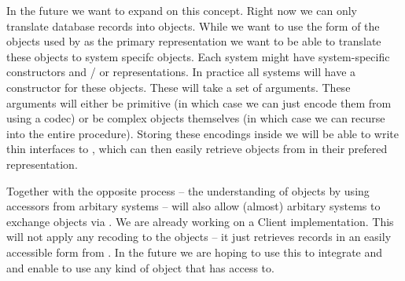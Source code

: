 \documentclass{deliverablereport}
\begin{document}
In the future we want to expand on this concept. Right now we can only translate database records into \MMT objects. While we want to use the form of the objects used by \MMT as the primary representation we want to be able to translate these objects to system specifc objects. Each system might have system-specific constructors and / or representations. In practice all systems will have a constructor for these objects. These will take a set of arguments. These arguments will either be primitive (in which case we can just encode them from \MMT using a codec) or be complex objects themselves (in which case we can recurse into the entire procedure). Storing these encodings inside \MMT we will be able to write thin interfaces to \MMT, which can then easily retrieve objects from \MMT in their prefered representation.

Together with the opposite process -- the understanding of objects by using accessors from arbitary systems -- will also allow (almost) arbitary systems to exchange objects via \MMT. We are already working on a \python Client implementation. This will not apply any recoding to the objects -- it just retrieves records in an easily accessible form from \MMT. In the future we are hoping to use this to integrate \MMT and \GAP and enable \GAP to use any kind of object that \MMT has access to.

\newpage\printbibliography

\appendix

\end{document}

